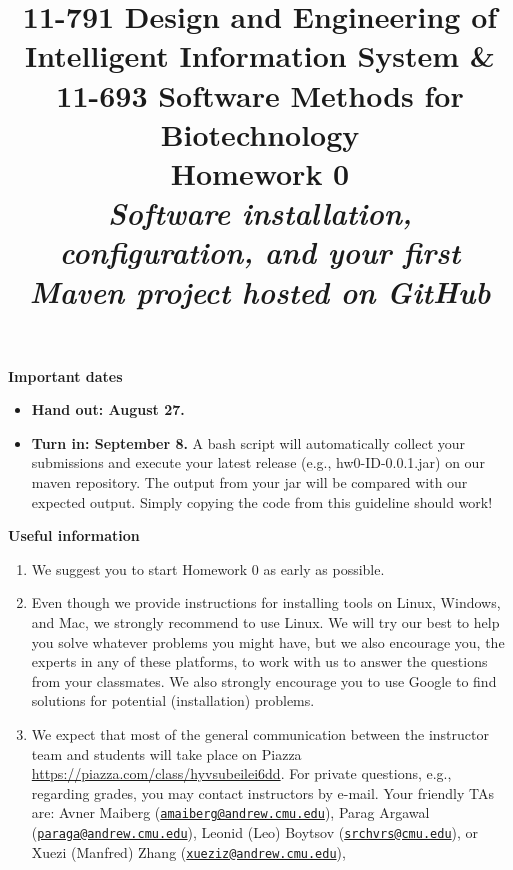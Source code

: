 \documentclass[oneside]{memoir}
\title{{\bfseries 11-791 Design and Engineering of Intelligent Information
System \& \\11-693 Software Methods for Biotechnology \\Homework 0}\\
\vspace{1em}
\itshape\rmfamily Software installation, configuration, and your first Maven
project hosted on GitHub}
\date{}
\begin{document}
\begin{titlingpage}
\maketitle

\hspace{-0.1\textwidth}
\begin{minipage}{1.2\textwidth}
\vspace{-5em}
\textbf{Important dates}
\begin{itemize}

\item \textbf{Hand out: August 27.}

\item \textbf{Turn in: September 8.} A bash script will automatically collect
your submissions and execute your latest release (e.g., hw0-ID-0.0.1.jar) on our
maven repository. The output from your jar will be compared with our expected
output. Simply copying the code from this guideline should work!
\end{itemize}

\textbf{Useful information}
\begin{enumerate}
\item We suggest you to start Homework 0 as early as possible.

\item 
Even though we provide instructions for installing tools on Linux, Windows,
and Mac, we strongly recommend to use Linux.
We will try our
best to help you solve whatever problems you might have, but we also encourage
you, the experts in any of these platforms, to work with us to answer the
questions from your classmates. 
We also strongly encourage you to use Google to find solutions for potential (installation) problems.

\item 
We expect that most of the general communication between the instructor team and students will take place on Piazza
\url{https://piazza.com/class/hyvsubeilei6dd}.
For private questions, e.g., regarding grades, you may contact instructors by e-mail.
Your friendly TAs are:
Avner Maiberg (\href{mailto:amaiberg@andrew.cmu.edu}{\nolinkurl{amaiberg@andrew.cmu.edu}}), 
Parag Argawal (\href{mailto:paraga@andrew.cmu.edu}{\nolinkurl{paraga@andrew.cmu.edu}}), 
Leonid (Leo) Boytsov (\href{mailto:srchvrs@cmu.edu}{\nolinkurl{srchvrs@cmu.edu}}), or 
Xuezi (Manfred) Zhang (\href{mailto:xueziz@andrew.cmu.edu}{\nolinkurl{xueziz@andrew.cmu.edu}}), 


\end{enumerate}
\end{minipage}
\end{titlingpage}
\end{document}
